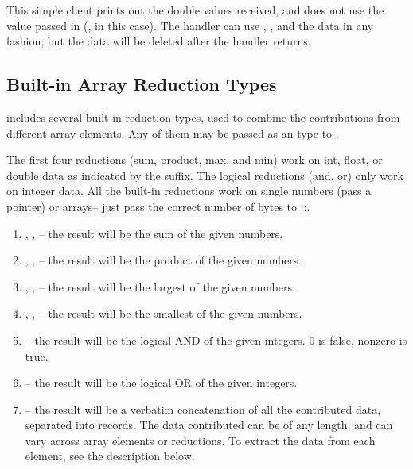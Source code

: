 This simple client prints out the double values received, and does not
use the  value passed in (, in this case).  The
handler can use , , and the data in any
fashion; but the data will be deleted after the handler returns.


\subsection{Built-in Array Reduction Types}

\charmpp{} includes several built-in reduction types, used to combine the
contributions from different array elements.  Any of them may be passed as an
 type to .

The first four reductions (sum, product, max, and min) work on int,
float, or double data as indicated by the suffix.  The logical
reductions (and, or) only work on integer data.  All the built-in
reductions work on single numbers (pass a pointer) or arrays-- just
pass the correct number of bytes to
::.

\begin{enumerate}

\item {}, , -- the
result will be the sum of the given numbers.

\item {}, ,
-- the result will be the product of the given numbers.

\item {}, , -- the
result will be the largest of the given numbers.

\item {}, , -- the
result will be the smallest of the given numbers.

\item {}-- the result will be the logical AND of the given
integers.  0 is false, nonzero is true.

\item {}-- the result will be the logical OR of the given
integers.

\item {}-- the result will be a verbatim concatenation of
all the contributed data, separated into  records.
The data contributed can be of any length, and can vary across array elements
or reductions.  To extract the data from each element, see the description
below.

\end{enumerate}


